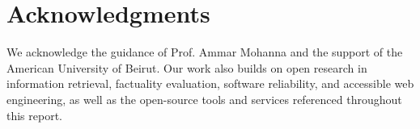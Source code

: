 \chapter*{Acknowledgments}
We acknowledge the guidance of Prof. Ammar Mohanna and the support of the American University of Beirut. Our work also builds on open research in information retrieval, factuality evaluation, software reliability, and accessible web engineering, as well as the open-source tools and services referenced throughout this report. 
